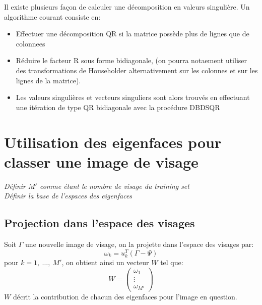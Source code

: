 \documentclass[12pt,french]{article}
\theoremstyle{plain}
\theoremstyle{definition}
\begin{document}
Il existe plusieurs façon de calculer une décomposition en valeurs singulière. Un algorithme courant consiste en:
\begin{itemize}
\item Effectuer une décomposition QR si la matrice possède plus de lignes que de colonnees
\item Réduire le facteur R sous forme bidiagonale, (on pourra notaement utiliser des transformations de Householder alternativement sur les colonnes et sur les lignes de la matrice).
\item Les valeurs singulières et vecteurs singuliers sont alors trouvés en effectuant une itération de type QR bidiagonale avec la procédure DBDSQR
\end{itemize}

\section{Utilisation des eigenfaces pour classer une image de visage}
\emph{Définir $M'$ comme étant le nombre de visage du training set}\\
\emph{Définir la base de l'espaces des eigenfaces}

\subsection{Projection dans l'espace des visages}
Soit $\Gamma$ une nouvelle image de visage, on la projette dans l'espace des visages par:
$$\omega_k = u_k^T(\Gamma - \Psi)$$
pour $k = 1,~\dots,~M'$, on obtient ainsi un vecteur $W$ tel que:
\[W =
  \begin{pmatrix}
    \omega_1 \\
    \vdots \\
    \omega_{M'}
  \end{pmatrix}
\]
$W$ décrit la contribution de chacun des eigenfaces pour l'image en question.
\end{document}
